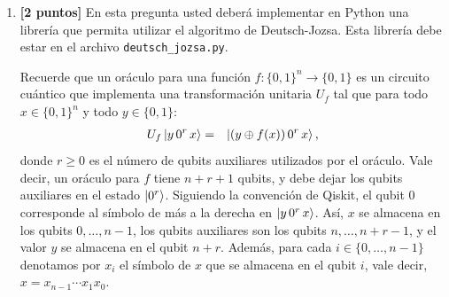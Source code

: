 \documentclass[10pt]{article}
\begin{document}
\begin{enumerate}
\item {\bf [2 puntos]} En esta pregunta usted deberá implementar en Python una librería que
  permita utilizar el algoritmo de Deutsch-Jozsa. Esta librería debe estar en el archivo
  \texttt{deutsch\_jozsa.py}.

  Recuerde que un oráculo para una función $f : \{0,1\}^n \to \{0,1\}$ es un circuito cuántico que
  implementa una transformación unitaria $U_f$ tal que para todo $x \in \{0,1\}^n$ y todo
  $y \in \{0,1\}$:
  \begin{eqnarray*}
    U_f \ket{y\, 0^r\, x} & = & \ket{(y \oplus f(x))\, 0^r\, x},
  \end{eqnarray*}
  donde $r \geq 0$ es el número de qubits auxiliares utilizados por el oráculo. Vale decir, un
  oráculo para $f$ tiene $n + r + 1$ qubits, y debe dejar los qubits auxiliares en el estado
  $\ket{0^r}$. Siguiendo la convención de Qiskit, el qubit 0 corresponde al símbolo de más a la
  derecha en $\ket{y\, 0^r\, x}$. Así, $x$ se almacena en los qubits $0, \ldots, n-1$, los qubits
  auxiliares son los qubits $n, \ldots, n+r-1$, y el valor $y$ se almacena en el qubit $n+r$. Además, para
  cada $i \in \{0, \ldots, n-1\}$ denotamos por $x_i$ el símbolo de $x$ que se almacena en el qubit
  $i$, vale decir, $x = x_{n-1} \cdots x_1 x_0$.


\end{enumerate}
\end{document}
